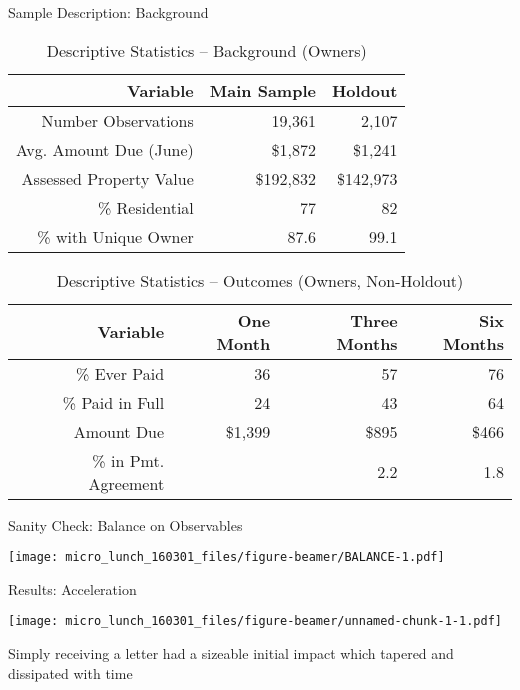 \documentclass[ignorenonframetext,]{beamer}
\begin{document}
\begin{frame}{Sample Description: Background}

\begin{table}[ht]
\centering
\caption{Descriptive Statistics -- Background (Owners)} 
\label{table:descriptivesI}
\begin{tabular}{|r|r|r|}
   \hline
Variable & Main Sample & Holdout \\ 
   \hline
Number Observations & 19,361 & 2,107 \\ 
  Avg. Amount Due (June) & \$1,872 & \$1,241 \\ 
  Assessed Property Value & \$192,832 & \$142,973 \\ 
  \% Residential & 77 & 82 \\ 
  \% with Unique Owner & 87.6 & 99.1 \\ 
   \hline
\end{tabular}
\end{table}\begin{table}[ht]
\centering
\caption{Descriptive Statistics -- Outcomes (Owners, Non-Holdout)} 
\label{table:descriptivesII}
\begin{tabular}{|r|r|r|r|}
  \hline
Variable & One Month & Three Months & Six Months \\ 
  \hline
\% Ever Paid & 36 & 57 & 76 \\ 
  \% Paid in Full & 24 & 43 & 64 \\ 
  Amount Due & \$1,399 & \$895 & \$466 \\ 
  \% in Pmt. Agreement &  & 2.2 & 1.8 \\ 
   \hline
\end{tabular}
\end{table}

\end{frame}

\begin{frame}{Sanity Check: Balance on Observables}

\texttt{[image: micro\_lunch\_160301\_files/figure-beamer/BALANCE-1.pdf]}

\end{frame}

\begin{frame}{Results: Acceleration}

\texttt{[image: micro\_lunch\_160301\_files/figure-beamer/unnamed-chunk-1-1.pdf]}

Simply receiving a letter had a sizeable initial impact which tapered
and dissipated with time

\end{frame}
\end{document}
